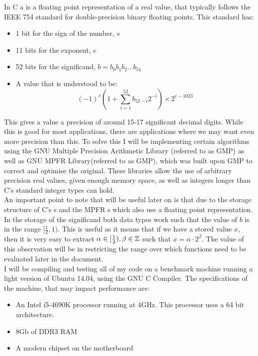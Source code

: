 In C a  is a floating point representation of a real value, that typically follows the IEEE 754 standard for double-precision binary floating points. This standard has:
\begin{itemize}
\item 1 bit for the sign of the number, \(s\)
\item 11 bits for the exponent, \(e\)
\item 52 bits for the significand, \(b = b_0b_1b_2\dots b_{51}\)
\item A value that is understood to be:
	\[(-1)^s\left(1 + \sum_{i=1}^{52}b_{52-i}2^{-i}\right) \times 2^{e-1023
}\]
\end{itemize}

This gives a  value a precision of around 15-17 significant decimal digits. While this is good for most applications, there are applications where we may want even more precision than this. To solve this I will be implementing certain algorithms using the GNU Multiple Precision Arithmetic Library (referred to as GMP) as well as GNU MPFR Library(referred to as GMP), which was built upon GMP to correct and optimise the original. These libraries allow the use of arbitrary precision real values, given enough memory space, as well as integers longer than C's standard integer types can hold.\\

An important point to note that will be useful later on is that due to the storage structure of C's s and the MPFR s which also use a floating point representation. In the storage of the significand both data types work such that the value of \(b\) is in the range \([\frac{1}{2}, 1)\). This is useful as it means that if we have a stored value \(x\), then it is very easy to extract \(\alpha\in[\frac{1}{2}), \beta \in \mathbb{Z}\) such that \(x = \alpha\cdot2^\beta\). The value of this observation will be in restricting the range over which functions need to be evaluated later in the document.\\

I will be compiling and testing all of my code on a benchmark machine running a light version of Ubuntu 14.04, using the GNU C Compiler. The specifications of the machine, that may impact performance are:
\begin{itemize}
\item An Intel i5-4690K processor running at 4GHz. This processor uses a 64 bit architecture.
\item 8Gb of DDR3 RAM
\item A modern chipset on the motherboard
\end{itemize}
